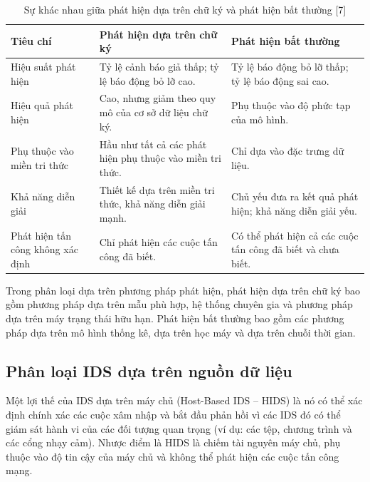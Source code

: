 \begin{table}[ht]
  \centering
  \caption{Sự khác nhau giữa phát hiện dựa trên chữ ký và phát hiện bất thường [7]}
  \label{tab:signature-vs-anomaly}
  \renewcommand{\arraystretch}{1.15}
  \begin{tabularx}{\textwidth}{%
      >{\raggedright\arraybackslash}p{}
      >{\raggedright\arraybackslash}X
      >{\raggedright\arraybackslash}X}
    \toprule
    \textbf{Tiêu chí} &
    \textbf{Phát hiện dựa trên chữ ký} &
    \textbf{Phát hiện bất thường} \\
    \midrule
    Hiệu suất phát hiện &
    Tỷ lệ cảnh báo giả thấp; tỷ lệ báo động bỏ lỡ cao. &
    Tỷ lệ báo động bỏ lỡ thấp; tỷ lệ báo động sai cao. \\
    Hiệu quả phát hiện &
    Cao, nhưng giảm theo quy mô của cơ sở dữ liệu chữ ký. &
    Phụ thuộc vào độ phức tạp của mô hình. \\
    Phụ thuộc vào miền tri thức &
    Hầu như tất cả các phát hiện phụ thuộc vào miền tri thức. &
    Chỉ dựa vào đặc trưng dữ liệu. \\
    Khả năng diễn giải &
    Thiết kế dựa trên miền tri thức, khả năng diễn giải mạnh. &
    Chủ yếu đưa ra kết quả phát hiện; khả năng diễn giải yếu. \\
    Phát hiện tấn công không xác định &
    Chỉ phát hiện các cuộc tấn công đã biết. &
    Có thể phát hiện cả các cuộc tấn công đã biết và chưa biết. \\
    \bottomrule
  \end{tabularx}
\end{table}

Trong phân loại dựa trên phương pháp phát hiện, phát hiện dựa trên chữ ký bao gồm phương pháp dựa trên mẫu phù hợp, hệ thống chuyên gia và phương pháp dựa trên máy trạng thái hữu hạn. Phát hiện bất thường bao gồm các phương pháp dựa trên mô hình thống kê, dựa trên học máy và dựa trên chuỗi thời gian.

\subsection{Phân loại IDS dựa trên nguồn dữ liệu}
Một lợi thế của IDS dựa trên máy chủ (Host-Based IDS – HIDS) là nó có thể xác định chính xác các cuộc xâm nhập và bắt đầu phản hồi vì các IDS đó có thể giám sát hành vi của các đối tượng quan trọng (ví dụ: các tệp, chương trình và các cổng nhạy cảm). Nhược điểm là HIDS là chiếm tài nguyên máy chủ, phụ thuộc vào độ tin cậy của máy chủ và không thể phát hiện các cuộc tấn công mạng. 

